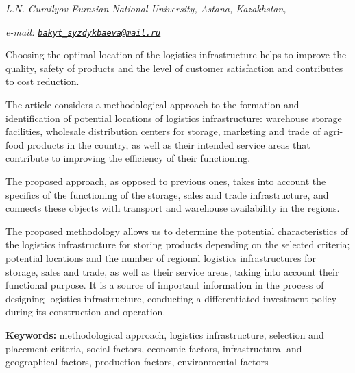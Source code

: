 \begin{affiliation}
\emph{L.N. Gumilyov Eurasian National University, Astana, Kazakhstan,}

\emph{e-mail: \href{mailto:bakyt_syzdykbaeva@mail.ru}{\nolinkurl{bakyt\_syzdykbaeva@mail.ru}}}
\end{affiliation}

Choosing the optimal location of the logistics infrastructure helps to
improve the quality, safety of products and the level of customer
satisfaction and contributes to cost reduction.

The article considers a methodological approach to the formation and
identification of potential locations of logistics infrastructure:
warehouse storage facilities, wholesale distribution centers for
storage, marketing and trade of agri-food products in the country, as
well as their intended service areas that contribute to improving the
efficiency of their functioning.

The proposed approach, as opposed to previous ones, takes into account
the specifics of the functioning of the storage, sales and trade
infrastructure, and connects these objects with transport and warehouse
availability in the regions.

The proposed methodology allows us to determine the potential
characteristics of the logistics infrastructure for storing products
depending on the selected criteria; potential locations and the number
of regional logistics infrastructures for storage, sales and trade, as
well as their service areas, taking into account their functional
purpose. It is a source of important information in the process of
designing logistics infrastructure, conducting a differentiated
investment policy during its construction and operation.

{\bfseries Keywords:} methodological approach, logistics infrastructure,
selection and placement criteria, social factors, economic factors,
infrastructural and geographical factors, production factors,
environmental factors

